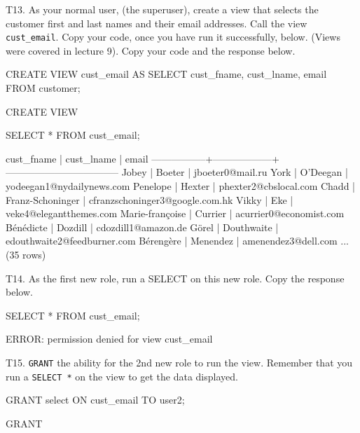 T13. As your normal user, (the superuser), create a view that selects the customer first and last names and their email addresses. Call the view \verb|cust_email|. Copy your code, once you have run it successfully, below. (Views were covered in lecture 9). Copy your code and the response below.
\begin{sql}
CREATE VIEW cust_email AS SELECT cust_fname, cust_lname, email FROM customer;
\end{sql}
\begin{pseudo}
CREATE VIEW
\end{pseudo}
\begin{sql}
SELECT * FROM cust_email;
\end{sql}
\begin{pseudo}
 cust_fname    |    cust_lname    |               email
-----------------+------------------+-----------------------------------
 Jobey           | Boeter           | jboeter0@mail.ru
 York            | O'Deegan         | yodeegan1@nydailynews.com
 Penelope        | Hexter           | phexter2@cbslocal.com
 Chadd           | Franz-Schoninger | cfranzschoninger3@google.com.hk
 Vikky           | Eke              | veke4@elegantthemes.com
 Marie-françoise | Currier          | acurrier0@economist.com
 Bénédicte       | Dozdill          | cdozdill1@amazon.de
 Görel           | Douthwaite       | edouthwaite2@feedburner.com
 Bérengère       | Menendez         | amenendez3@dell.com
...
(35 rows)
\end{pseudo}

T14. As the first new role, run a SELECT on this new role. Copy the response below. 
\begin{sql}
SELECT * FROM cust_email;
\end{sql}
\begin{pseudo}
ERROR:  permission denied for view cust_email
\end{pseudo}

T15. \verb|GRANT| the ability for the 2nd new role to run the view. Remember that you run a \verb|SELECT *| on the view to get the data displayed.
\begin{sql}
GRANT select ON cust_email TO user2;
\end{sql}
\begin{pseudo}
GRANT
\end{pseudo}

